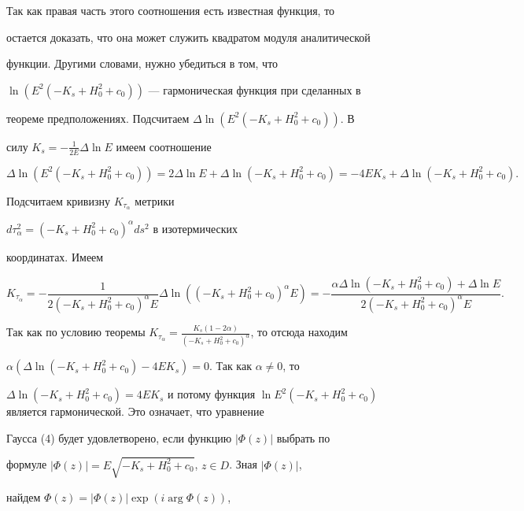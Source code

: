 Так как правая часть этого соотношения есть известная функция, то 


остается доказать, что она может служить квадратом модуля аналитической 


функции. Другими словами, нужно убедиться в том, что 


$\ln(E^2(-K_s+H^2_0+c_0))$ --- гармоническая функция при сделанных в 


теореме предположениях. Подсчитаем $\Delta\ln(E^2(-K_s+H^2_0+c_0))$. В 


силу $K_s=-\frac{1}{2E}\Delta\ln E$ имеем соотношение 


$$ 


\Delta\ln(E^2(-K_s+H^2_0+c_0))=2\Delta\ln E+ 


\Delta\ln(-K_s+H^2_0+c_0)=-4EK_s+\Delta\ln(-K_s+H^2_0+c_0). 


$$ 


 


Подсчитаем кривизну $K_{\tau_\alpha}$ метрики 


$d\tau^2_\alpha=(-K_s+H^2_0+c_0)^\alpha ds^2$ в изотермических 


координатах. Имеем 


$$ 


K_{\tau_\alpha}=-\frac{1} 


{2(-K_s+H^2_0+c_0)^\alpha E}\Delta\ln((-K_s+H^2_0+c_0)^\alpha E)= 


-\frac{\alpha\Delta\ln(-K_s+H^2_0+c_0)+\Delta\ln E} 


{2(-K_s+H^2_0+c_0)^\alpha E}. 


$$ 


 


Так как по условию теоремы $K_{\tau_\alpha}=\frac{K_s(1-2\alpha)} 


{(-K_s+H^2_0+c_0)^\alpha}$, то отсюда находим 


$\alpha(\Delta\ln(-K_s+H^2_0+c_0)-4EK_s)=0$. Так как $\alpha\ne0$, то 


$\Delta\ln(-K_s+H^2_0+c_0)=4EK_s$ и потому функция $\ln 


E^2(-K_s+H^2_0+c_0)$ является гармонической. Это означает, что уравнение 


Гаусса (4) будет удовлетворено, если функцию $|\Phi(z)|$ выбрать по 


формуле $|\Phi(z)|=E\sqrt{-K_s+H^2_0+c_0}$, $z\in D$. Зная $|\Phi(z)|$, 


найдем $\Phi(z)=|\Phi(z)|\exp(i\arg\Phi(z))$, 


